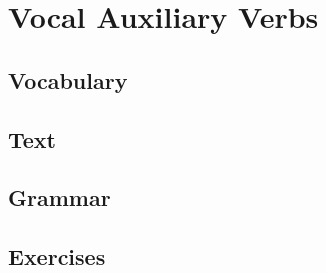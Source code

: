 \chapter{Vocal Auxiliary Verbs}
\section*{Vocabulary}
\section*{Text}
\section*{Grammar}
\section*{Exercises}
